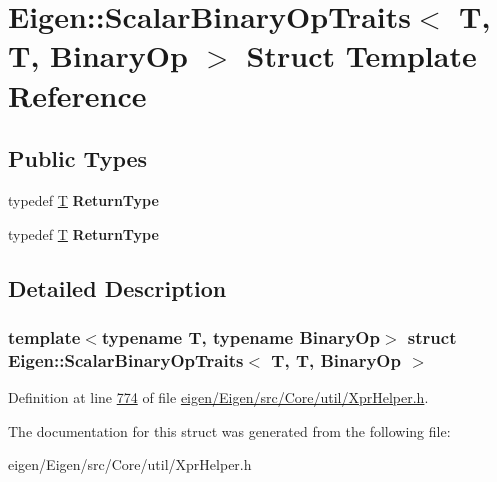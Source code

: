 \hypertarget{struct_eigen_1_1_scalar_binary_op_traits_3_01_t_00_01_t_00_01_binary_op_01_4}{}\section{Eigen\+:\+:Scalar\+Binary\+Op\+Traits$<$ T, T, Binary\+Op $>$ Struct Template Reference}
\label{struct_eigen_1_1_scalar_binary_op_traits_3_01_t_00_01_t_00_01_binary_op_01_4}
\subsection*{Public Types}
\begin{DoxyCompactItemize}
\item 
\mbox{\label{struct_eigen_1_1_scalar_binary_op_traits_3_01_t_00_01_t_00_01_binary_op_01_4_a3ddad9b7a6d73680e9bb6f541df70524}} 
typedef \hyperlink{group___sparse_core___module}{T} {\bfseries Return\+Type}
\item 
\mbox{\label{struct_eigen_1_1_scalar_binary_op_traits_3_01_t_00_01_t_00_01_binary_op_01_4_a3ddad9b7a6d73680e9bb6f541df70524}} 
typedef \hyperlink{group___sparse_core___module}{T} {\bfseries Return\+Type}
\end{DoxyCompactItemize}


\subsection{Detailed Description}
\subsubsection*{template$<$typename T, typename Binary\+Op$>$\newline
struct Eigen\+::\+Scalar\+Binary\+Op\+Traits$<$ T, T, Binary\+Op $>$}



Definition at line \hyperlink{eigen_2_eigen_2src_2_core_2util_2_xpr_helper_8h_source_l00774}{774} of file \hyperlink{eigen_2_eigen_2src_2_core_2util_2_xpr_helper_8h_source}{eigen/\+Eigen/src/\+Core/util/\+Xpr\+Helper.\+h}.



The documentation for this struct was generated from the following file\+:\begin{DoxyCompactItemize}
\item 
eigen/\+Eigen/src/\+Core/util/\+Xpr\+Helper.\+h\end{DoxyCompactItemize}
